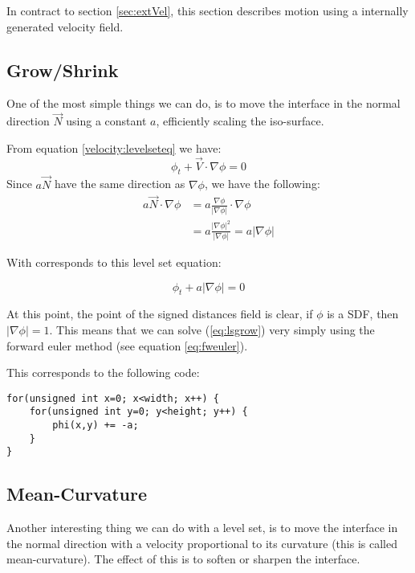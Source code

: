 

In contract to section \vref{sec:extVel}, this section describes
motion using a internally generated velocity field.

\newpage

\subsection{Grow/Shrink}

One of the most simple things we can do, is to move the interface in
the normal direction $\vec{N}$ using a constant $a$, efficiently
scaling the iso-surface.

From equation \vref{velocity:levelseteq} we have:
\begin{equation}
  \phi_t + \vec{V}\cdot \nabla \phi = 0
\end{equation}
Since $a\vec{N}$ have the same direction as $\nabla{\phi}$, we have the following:
\begin{align*}
  a\vec{N}\cdot\nabla\phi &=
  a\frac{\nabla\phi}{|\nabla\phi|}\cdot\nabla\phi \\
  &= a\frac{|\nabla\phi|^2}{|\nabla\phi|} 
  = a|\nabla\phi|
\end{align*}

With corresponds to this level set equation:

\begin{equation}
  \phi_t + a |\nabla \phi| = 0
\end{equation}\label{eq:lsgrow}

At this point, the point of the signed distances field is clear, if
$\phi$ is a SDF, then $|\nabla\phi| = 1$. This means that we can solve
(\ref{eq:lsgrow}) very simply using the forward euler method (see
equation \ref{eq:fweuler}).

This corresponds to the following code:

\begin{lstlisting}
for(unsigned int x=0; x<width; x++) {
    for(unsigned int y=0; y<height; y++) {
        phi(x,y) += -a;
    }
}
\end{lstlisting}


\subsection{Mean-Curvature}

Another interesting thing we can do with a level set, is to move the
interface in the normal direction with a velocity proportional to its
curvature (this is called mean-curvature). The effect of this is to
soften or sharpen the interface.

